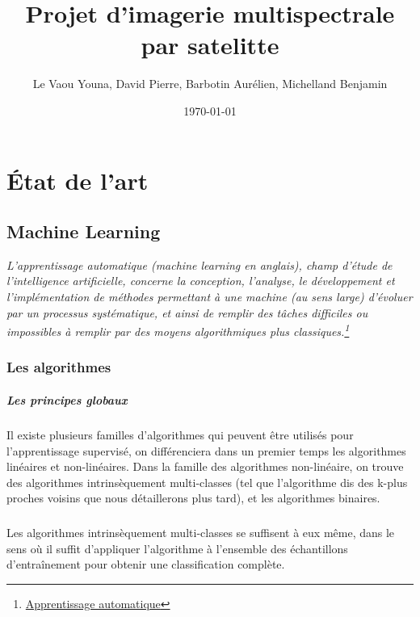 \documentclass[a4paper,twoside]{report}
\begin{document}
\title{Projet d'imagerie multispectrale par satelitte}
\author{Le Vaou Youna, David Pierre, Barbotin Aurélien, Michelland Benjamin}
\date\today
\maketitle
\chapter{État de l'art}
\section{Machine Learning}
\textit{L'apprentissage automatique (machine learning en anglais), champ d'étude de l'intelligence artificielle, concerne la conception, l'analyse, le développement et l'implémentation de méthodes permettant à une machine (au sens large) d'évoluer par un processus systématique, et ainsi de remplir des tâches difficiles ou impossibles à remplir par des moyens algorithmiques plus classiques.\footnote{\href{https://fr.wikipedia.org/wiki/Apprentissage_automatique}{Apprentissage automatique}}}
\subsection{Les algorithmes}
\paragraph{Les principes globaux\\}
Il existe plusieurs familles d'algorithmes qui peuvent être utilisés pour l'apprentissage supervisé, on différenciera dans un premier temps les algorithmes linéaires et non-linéaires. Dans la famille des algorithmes non-linéaire, on trouve des algorithmes intrinsèquement multi-classes (tel que l'algorithme dis des k-plus proches voisins que nous détaillerons plus tard), et les algorithmes binaires.\newline

\paragraph{}
Les algorithmes intrinsèquement multi-classes se suffisent à eux même, dans le sens où il suffit d'appliquer l'algorithme à l'ensemble des échantillons d'entraînement pour obtenir une classification complète.\newpage
\end{document}
